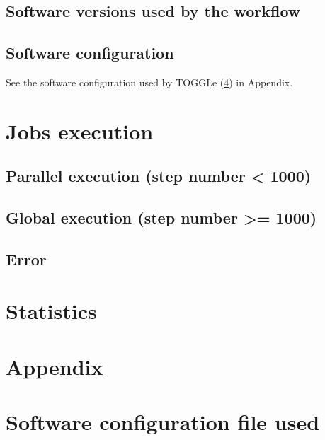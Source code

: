 \documentclass[a4paper]{article}
\begin{document}
\subsection{Software versions used by the workflow}

\begin{minipage}{\linewidth}

\end{minipage}

\subsection{Software configuration}
See the software configuration used by TOGGLe (\ref{appendix:config})  in Appendix.



 
 
\section{Jobs execution}

\subsection{Parallel execution (step number < 1000)}



\subsection{Global execution (step number >= 1000)}


\subsection{Error}

\newpage
\section{Statistics}



\cite{Monat2015}

\clearpage

%


\clearpage
\section{Appendix}\appendix

\section{ Software configuration file used}
\label{appendix:config}

\end{document}
